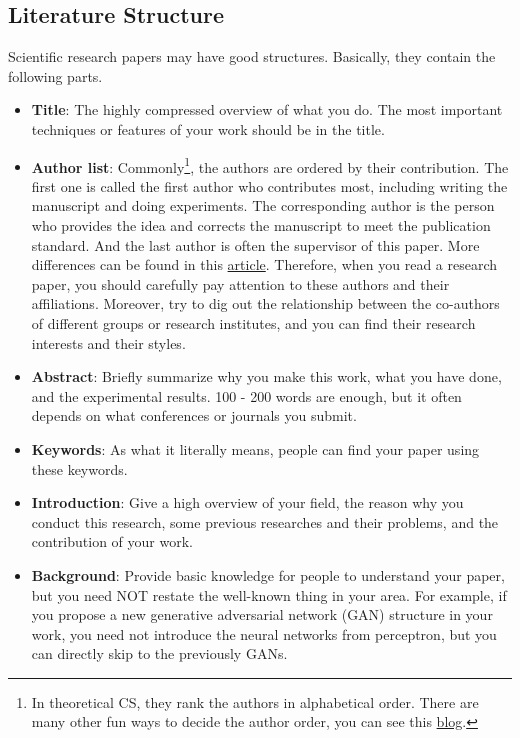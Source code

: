 \documentclass[english]{../TexTemplate/thesis}
\begin{document}
\subsection{Literature Structure}
Scientific research papers may have good structures.
Basically, they contain the following parts.
\begin{itemize}
	\item \textbf{Title}: The highly compressed overview of what you do. The most important techniques or features of your work should be in the title.
	\item \textbf{Author list}: Commonly\footnote{In theoretical CS, they rank the authors in alphabetical order. There are many other fun ways to decide the author order, you can see this \href{https://dynamicecology.wordpress.com/2016/09/21/fun-ways-of-deciding-authorship-order/}{blog}.}, the authors are ordered by their contribution. The first one is called the first author who contributes most, including writing the manuscript and doing experiments. The corresponding author is the person who provides the idea and corrects the manuscript to meet the publication standard. And the last author is often the supervisor of this paper. More differences can be found in this \href{https://www.quora.com/What-is-the-difference-between-the-corresponding-author-and-the-first-author-in-a-research-paper}{article}.
	Therefore, when you read a research paper, you should carefully pay attention to these authors and their affiliations. Moreover, try to dig out the relationship between the co-authors of different groups or research institutes, and you can find their research interests and their styles.
	\item \textbf{Abstract}: Briefly summarize why you make this work, what you have done, and the experimental results. 100 - 200 words are enough, but it often depends on what conferences or journals you submit.
	\item \textbf{Keywords}: As what it literally means, people can find your paper using these keywords.
	\item \textbf{Introduction}: Give a high overview of your field, the reason why you conduct this research, some previous researches and their problems, and the contribution of your work.
	\item \textbf{Background}: Provide basic knowledge for people to understand your paper, but you need NOT restate the well-known thing in your area. For example, if you propose a new generative adversarial network (GAN) structure in your work, you need not introduce the neural networks from perceptron, but you can directly skip to the previously GANs.

\end{itemize}
\end{document}
